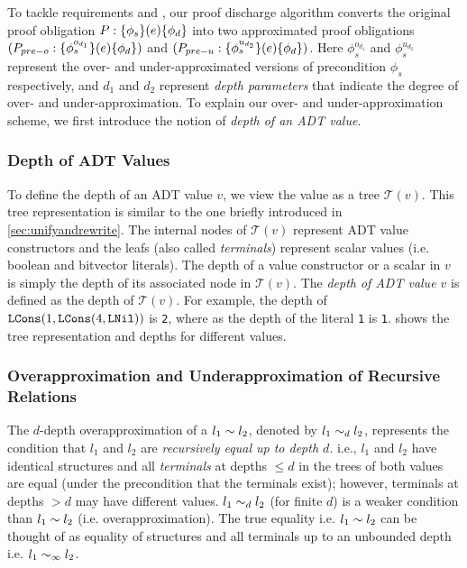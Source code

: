 To tackle requirements  and ,
our proof discharge algorithm converts the original proof obligation $P: \{\phi_s\}(e)\{\phi_d\}$
into two approximated proof obligations $(P_{pre-o}: \{\phi^{o_{d_1}}_s\}(e)\{\phi_d\})$
and $(P_{pre-u}: \{\phi^{u_{d_2}}_s\}(e)\{\phi_d\})$.
Here $\phi^{o_{d_1}}_s$ and $\phi^{u_{d_2}}_s$ represent the over- and under-approximated
versions of precondition $\phi_s$ respectively, and $d_1$ and $d_2$ represent
{\em depth parameters} that indicate the degree of over- and under-approximation.
To explain our over- and under-approximation scheme, we
first introduce the notion of {\em depth of an ADT value}.

\subsubsection{Depth of ADT Values}
To define the depth of an ADT value $v$, we view the value as a tree $\mathcal{T}(v)$.
This tree representation is similar to the one briefly introduced in \cref{sec:unifyandrewrite}.
The internal nodes of $\mathcal{T}(v)$ represent ADT value constructors and
the leafs (also called {\em terminals}) represent scalar values (i.e. boolean and bitvector literals).
The depth of a value constructor or a scalar in $v$ is simply the depth of
its associated node in $\mathcal{T}(v)$.
The {\em depth of ADT value $v$} is defined as the depth of $\mathcal{T}(v)$.
For example, the depth of ${\tt LCons}(1, {\tt LCons}(4, {\tt LNil}))$ is {\tt 2},
where as the depth of the literal {\tt 1} is {\tt 1}.
 shows the tree representation and depths for different values.

\subsubsection{Overapproximation and Underapproximation of Recursive Relations}
The $d$-depth overapproximation of a \recursiveRelation{} $l_1 \sim{} l_2$,
denoted by $l_1 \sim_d l_2$, represents the condition that
$l_1$ and $l_2$ are {\em recursively equal up to depth $d$}. i.e.,
$l_1$ and $l_2$ have identical structures and all
{\em terminals} at depths $\leq d$ in the trees of both values
are equal (under the precondition that the terminals exist);
however, terminals at depths $>d$ may have different values.
$l_1 \sim_d l_2$ (for finite $d$) is a weaker
condition than $l_1 \sim{} l_2$ (i.e. overapproximation).
The true equality i.e. $l_1 \sim{} l_2$ can be thought of as equality of structures
and all terminals up to an unbounded depth i.e. $l_1 \sim_\infty l_2$.

